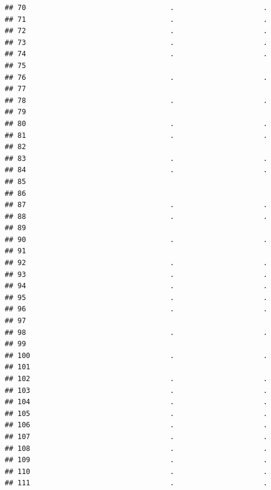 \documentclass[
]{article}
\begin{document}
\begin{verbatim}
## 70                                  .                     .
## 71                                  .                     .
## 72                                  .                     .
## 73                                  .                     .
## 74                                  .                     .
## 75                                                         
## 76                                  .                     .
## 77                                                         
## 78                                  .                     .
## 79                                                         
## 80                                  .                     .
## 81                                  .                     .
## 82                                                         
## 83                                  .                     .
## 84                                  .                     .
## 85                                                         
## 86                                                         
## 87                                  .                     .
## 88                                  .                     .
## 89                                                         
## 90                                  .                     .
## 91                                                         
## 92                                  .                     .
## 93                                  .                     .
## 94                                  .                     .
## 95                                  .                     .
## 96                                  .                     .
## 97                                                         
## 98                                  .                     .
## 99                                                         
## 100                                 .                     .
## 101                                                        
## 102                                 .                     .
## 103                                 .                     .
## 104                                 .                     .
## 105                                 .                     .
## 106                                 .                     .
## 107                                 .                     .
## 108                                 .                     .
## 109                                 .                     .
## 110                                 .                     .
## 111                                 .                     .

\end{verbatim}
\end{document}
